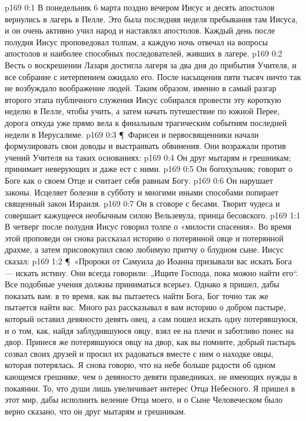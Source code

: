 \vs p169 0:1 В понедельник 6 марта поздно вечером Иисус и десять апостолов вернулись в лагерь в Пелле. Это была последняя неделя пребывания там Иисуса, и он очень активно учил народ и наставлял апостолов. Каждый день после полудня Иисус проповедовал толпам, а каждую ночь отвечал на вопросы апостолов и наиболее способных последователей, живших в лагере.
\vs p169 0:2 Весть о воскрешении Лазаря достигла лагеря за два дня до прибытия Учителя, и все собрание с нетерпением ожидало его. После насыщения пяти тысяч ничто так не возбуждало воображение людей. Таким образом, именно в самый разгар второго этапа публичного служения Иисус собирался провести эту короткую неделю в Пелле, чтобы учить, а затем начать путешествие по южной Перее, дорога откуда уже прямо вела к финальным трагическим событиям последней недели в Иерусалиме.
\vs p169 0:3 \P\ Фарисеи и первосвященники начали формулировать свои доводы и выстраивать обвинения. Они возражали против учений Учителя на таких основаниях:
\vs p169 0:4 \bibnobreakspace Он друг мытарям и грешникам; принимает неверующих и даже ест с ними.
\vs p169 0:5 \bibnobreakspace Он богохульник; говорит о Боге как о своем Отце и считает себя равным Богу.
\vs p169 0:6 \bibnobreakspace Он нарушает законы. Исцеляет болезни в субботу и многими иными способами попирает священный закон Израиля.
\vs p169 0:7 \bibnobreakspace Он в сговоре с бесами. Творит чудеса и совершает кажущееся необычным силою Вельзевула, принца бесовского.
\vs p169 1:1 В четверг после полудня Иисус говорил толпе о «милости спасения». Во время этой проповеди он снова рассказал историю о потерянной овце и потерянной драхме, а затем присовокупил свою любимую притчу о блудном сыне. Иисус сказал:
\vs p169 1:2 \P\ «Пророки от Самуила до Иоанна призывали вас искать Бога --- искать истину. Они всегда говорили: „Ищите Господа, пока можно найти его“. Все подобные учения должны приниматься всерьез. Однако я пришел, дабы показать вам: в то время, как вы пытаетесь найти Бога, Бог точно так же пытается найти вас. Много раз рассказывал я вам историю о добром пастыре, который оставил девяносто девять овец, а сам пошел искать одну потерявшуюся, и о том, как, найдя заблудившуюся овцу, взял ее на плечи и заботливо понес на двор. Принеся же потерявшуюся овцу на двор, как вы помните, добрый пастырь созвал своих друзей и просил их радоваться вместе с ним о находке овцы, которая потерялась. Я снова говорю, что на небе больше радости об одном кающемся грешнике, чем о девяносто девяти праведниках, не имеющих нужды в покаянии. То, что души  лишь увеличивает интерес Отца Небесного. Я пришел в этот мир, дабы исполнить веление Отца моего, и о Сыне Человеческом было верно сказано, что он друг мытарям и грешникам.
